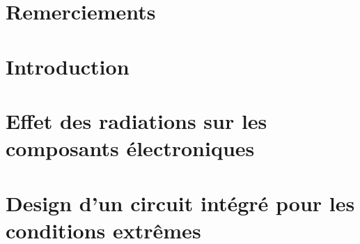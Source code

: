 \documentclass[12pt,a4paper]{report}
\begin{document}





\chapter*{Remerciements}



\tableofcontents
\newpage

\chapter*{Introduction}
 

\chapter{Effet des radiations sur les composants électroniques}
% 


% 
\chapter{Design d'un circuit intégré pour les conditions extrêmes}


\end{document}
